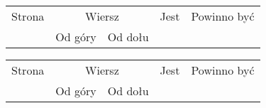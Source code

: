 \documentclass[a4paper,11pt]{article}
\begin{document}
\begin{center}

  \begin{tabular}{|c|c|c|c|c|}
    \hline
    Strona & \multicolumn{2}{c|}{Wiersz} & Jest
                              & Powinno być \\ \cline{2-3}
    & Od góry & Od dołu & & \\
    \hline
    \hline
  \end{tabular}





  \newpage

  \begin{tabular}{|c|c|c|c|c|}
    \hline
    Strona & \multicolumn{2}{c|}{Wiersz} & Jest
                              & Powinno być \\ \cline{2-3}
    & Od góry & Od dołu & & \\
    \hline
    \hline
  \end{tabular}

\end{center}

\vspace{\spaceTwo}


\noindent
\StrWg{}{} \\
\Jest   \\
\Powin  \\












\newpage

\Work{ %
  \\
  \textit{}, \cite{}}

\vspace{0em}



\vspace{0em}
\end{document}
